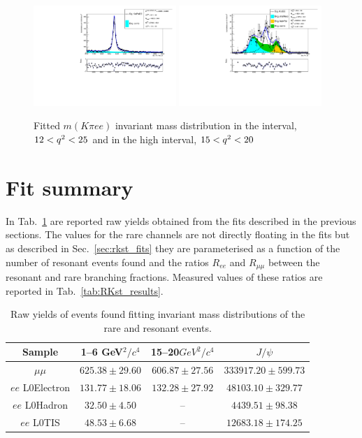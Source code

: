 \begin{figure}[h!]
\centering
\includegraphics[width=0.48\textwidth]{RKst/figs/fit_EEs_0_EE-q2high-gmc/KstPsiEE_L0E_fitAndRes.pdf}
\includegraphics[width=0.48\textwidth]{RKst/figs/fit_EEs_0_EE-q2high-gmc/KstEE_L0E_fitAndRes.pdf}
\caption{Fitted $m(K\pi ee)$ invariant mass distribution in the \psitwos interval, $12 < {q^2} < 25$ \gevgevcccc
and in the high \qsq interval, $15 < {q^2} < 20$ \gevgevcccc }
\label{fig:fit_ee_highq2}
\end{figure}

\section{Fit summary}

In Tab.~\ref{tab:RKst_yields} are reported raw yields obtained from the
fits described in the previous sections. The values for the rare channels are not
directly floating in the fits but as described in Sec.~\ref{sec:rkst_fits} they are parameterised
as a function of the number of resonant events found and the ratios $R_{ee}$ and $R_{\mu\mu}$
between the resonant and rare branching fractions. Measured values of these ratios are reported 
in Tab.~\ref{tab:RKst_results}.

\begin{table}
\centering
\begin{tabular}{|c|c|c|c|}
\hline
 Sample 			& 1--6 GeV$^2/c^4$ 				& 15--20$ GeV^2/c^4$ 				& $J/\psi$  \\ \hline
$\mu\mu$ 			& $ 625.38  \pm  29.60 $ & $ 606.87  \pm  27.56 $ & $ 333917.20  \pm  599.73 $ \\
$ee$ L0Electron 	& $ 131.77  \pm  18.06 $ & $ 132.28  \pm  27.92 $ & $ 48103.10  \pm  329.77 $ \\
$ee$ L0Hadron 	& $ 32.50  \pm  4.50 $ & -- & $ 4439.51  \pm  98.38 $ \\
$ee$ L0TIS 	& $ 48.53  \pm  6.68 $ & -- & $ 12683.18  \pm  174.25 $ \\
\hline 
 \end{tabular}
\caption{Raw yields of events found fitting invariant mass distributions of the rare and resonant events. }
\label{tab:RKst_yields}
\end{table}


\clearpage

